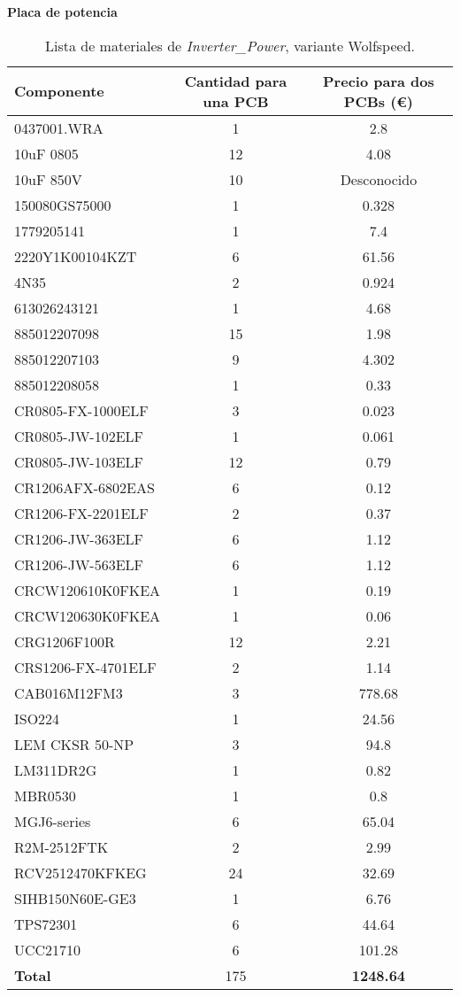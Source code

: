 \textbf{Placa de potencia}
\begin{table}[H]
	\centering
	\begin{tabular}{|l|c|c|}
		\hline
		\textbf{Componente} & \textbf{Cantidad para una PCB} & \textbf{Precio para dos PCBs (\euro{})} \\
		\hline
		0437001.WRA & 1 & 2.8 \\
		10uF 0805 & 12 & 4.08 \\
		10uF 850V & 10 & Desconocido \\
		150080GS75000 & 1 & 0.328 \\
		1779205141 & 1 & 7.4 \\
		2220Y1K00104KZT & 6 & 61.56 \\
		4N35 & 2 & 0.924 \\
		613026243121 & 1 & 4.68 \\
		885012207098 & 15 & 1.98 \\
		885012207103 & 9 & 4.302 \\
		885012208058 & 1 & 0.33 \\
		CR0805-FX-1000ELF & 3 & 0.023 \\
		CR0805-JW-102ELF & 1 & 0.061 \\
		CR0805-JW-103ELF & 12 & 0.79 \\
		CR1206AFX-6802EAS & 6 & 0.12 \\
		CR1206-FX-2201ELF & 2 & 0.37 \\
		CR1206-JW-363ELF & 6 & 1.12 \\
		CR1206-JW-563ELF & 6 & 1.12 \\
		CRCW120610K0FKEA & 1 & 0.19 \\
		CRCW120630K0FKEA & 1 & 0.06 \\
		CRG1206F100R & 12 & 2.21 \\
		CRS1206-FX-4701ELF & 2 & 1.14 \\
		CAB016M12FM3 & 3 & 778.68 \\
		ISO224 & 1 & 24.56 \\
		LEM CKSR 50-NP & 3 & 94.8 \\
		LM311DR2G & 1 & 0.82 \\
		MBR0530 & 1 & 0.8 \\
		MGJ6-series & 6 & 65.04 \\
		R2M-2512FTK & 2 & 2.99 \\
		RCV2512470KFKEG & 24 & 32.69 \\
		SIHB150N60E-GE3 & 1 & 6.76 \\
		TPS72301 & 6 & 44.64 \\
		UCC21710 & 6 & 101.28 \\
		\hline
		\textbf{Total} & 175 & \textbf{1248.64} \\
		\hline
	\end{tabular}
	\caption{Lista de materiales de \textit{Inverter\_Power}, variante Wolfspeed.}
\end{table}


